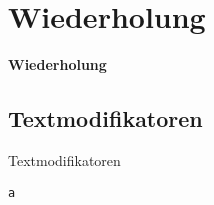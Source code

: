 \section{Wiederholung}
\begin{frame}[c]
	\begin{center}
		\LARGE \textbf{Wiederholung}
	\end{center}
\end{frame}
\subsection{Textmodifikatoren}
\begin{frame}[c]
	\begin{center}
		\large Textmodifikatoren
	\end{center}
\end{frame}
\begin{frame}[fragile]
	\Ausgabe
	\begin{outputbox}
		
	\end{outputbox}

	\pause\Code
	\begin{lstlisting}
a
	\end{lstlisting}
\end{frame}